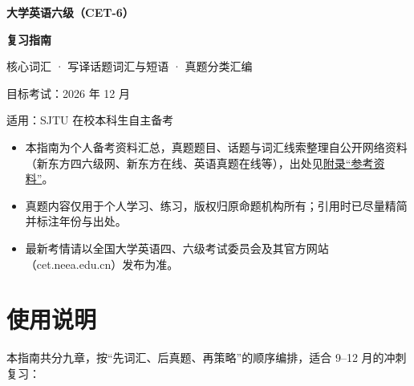 \hypersetup{pageanchor=false}
\begin{titlepage}
\centering
\thispagestyle{empty}
\vspace*{2.0cm}

{\color{mainblue}\Huge\bfseries 大学英语六级（CET-6）\par}
\vspace{0.45cm}
{\color{mainblue}\Huge\bfseries 复习指南\par}

\vspace{0.9cm}
{\Large\color{black!70} 核心词汇 · 写译话题词汇与短语 · 真题分类汇编\par}

\vspace{1.6cm}
{\large 目标考试：2026 年 12 月\par}
\vspace{0.3cm}
{\large 适用：SJTU 在校本科生自主备考\par}

\vfill

\begin{minipage}{0.86\textwidth}
\begin{notebox}[资料说明]
\begin{itemize}
  \item 本指南为个人备考资料汇总，真题题目、话题与词汇线索整理自公开网络资料（新东方四六级网、新东方在线、英语真题在线等），出处见\hyperref[sec:references]{附录“参考资料”}。
  \item 真题内容仅用于个人学习、练习，版权归原命题机构所有；引用时已尽量精简并标注年份与出处。
  \item 最新考情请以全国大学英语四、六级考试委员会及其官方网站（cet.neea.edu.cn）发布为准。
\end{itemize}
\end{notebox}
\end{minipage}

\vspace{1.0cm}
\end{titlepage}
\hypersetup{pageanchor=true}

\section*{使用说明}
{}

本指南共分九章，按“先词汇、后真题、再策略”的顺序编排，适合 9--12 月的冲刺复习：

